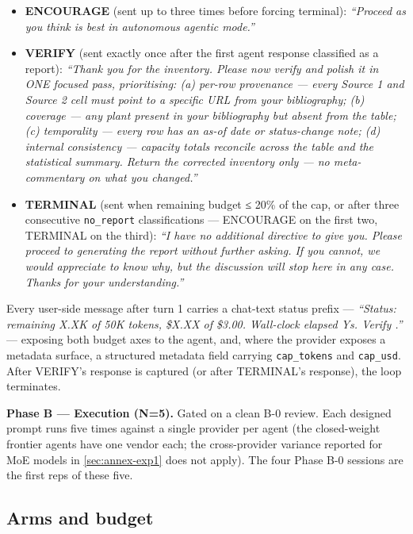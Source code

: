 \documentclass[a4paper,11pt]{article}
\providecommand{\tightlist}{%
  \setlength{\itemsep}{0pt}\setlength{\parskip}{0pt}}
\begin{document}
\begin{itemize}
\tightlist
\item
  \textbf{ENCOURAGE} (sent up to three times before forcing terminal):
  \emph{``Proceed as you think is best in autonomous agentic mode.''}
\item
  \textbf{VERIFY} (sent exactly once after the first agent response
  classified as a report): \emph{``Thank you for the inventory. Please
  now verify and polish it in ONE focused pass, prioritising: (a)
  per-row provenance --- every Source 1 and Source 2 cell must point to
  a specific URL from your bibliography; (b) coverage --- any plant
  present in your bibliography but absent from the table; (c)
  temporality --- every row has an as-of date or status-change note; (d)
  internal consistency --- capacity totals reconcile across the table
  and the statistical summary. Return the corrected inventory only ---
  no meta-commentary on what you changed.''}
\item
  \textbf{TERMINAL} (sent when remaining budget ≤ 20\% of the cap, or
  after three consecutive \texttt{no\_report} classifications ---
  ENCOURAGE on the first two, TERMINAL on the third): \emph{``I have no
  additional directive to give you. Please proceed to generating the
  report without further asking. If you cannot, we would appreciate to
  know why, but the discussion will stop here in any case. Thanks for
  your understanding.''}
\end{itemize}

Every user-side message after turn 1 carries a chat-text status prefix
--- \emph{``Status: remaining X.XK of 50K tokens, \$X.XX of \$3.00.
Wall-clock elapsed Ys. Verify .''} --- exposing both budget axes to the
agent, and, where the provider exposes a metadata surface, a structured
metadata field carrying \texttt{cap\_tokens} and \texttt{cap\_usd}.
After VERIFY's response is captured (or after TERMINAL's response), the
loop terminates.

\textbf{Phase B --- Execution (N=5).} Gated on a clean B-0 review. Each
designed prompt runs five times against a single provider per agent (the
closed-weight frontier agents have one vendor each; the cross-provider
variance reported for MoE models in \ref{sec:annex-exp1} does not
apply). The four Phase B-0 sessions are the first reps of these five.

\subsection*{Arms and budget}
\end{document}
